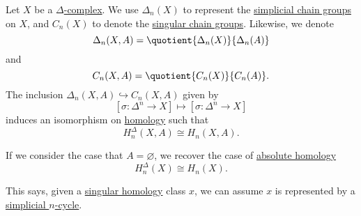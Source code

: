 \begin{theorem}\label{thm:singular-homology-agrees-with-simplicial-homology}
	Let $X$ be a \hyperref[def:delta-complex]{$\Delta$-complex}. We use $\Delta_n(X)$ to represent the \hyperref[def:simplicial-complex]{simplicial chain groups} on $X$, and
	$C_n(X)$ to denote the \hyperref[def:singular-chain]{singular chain groups}. Likewise, we denote
	\[
		\Delta_n(X, A) = \quotient{\Delta_n(X)}{\Delta_n(A)}
	\]
	and
	\[
		C_n(X, A) = \quotient{C_n(X)}{C_n(A)}.
	\]
	The inclusion $\Delta_n(X, A) \hookrightarrow C_n(X, A)$ given by
	\[
		[\sigma : \Delta^n \to X] \mapsto [\sigma : \Delta^n \to X]
	\]
	induces an isomorphism on \hyperref[def:homology-group]{homology} such that
	\[
		H_n^\Delta(X, A) \cong H_n(X, A).
	\]

	If we consider the case that \(A = \varnothing\), we recover the case of \hyperref[def:homology-group]{absolute homology}
	\[
		H_n^\Delta(X) \cong H_n(X).
	\]
\end{theorem}
\begin{note}
	This says, given a \hyperref[def:singular-homology-group]{singular homology} class $x$, we can assume $x$ is represented by a \hyperref[def:simplicial-complex]{simplicial $n$-cycle}.
\end{note}
